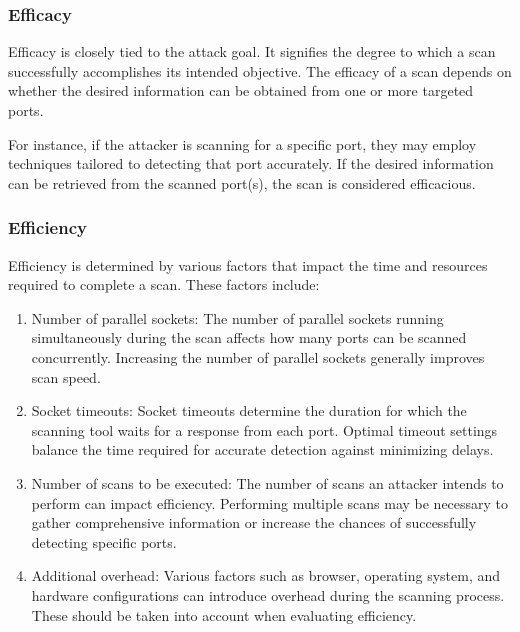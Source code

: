 \subsubsection{Efficacy}

Efficacy is closely tied to the attack goal. It signifies the degree to which a scan successfully accomplishes its intended objective. The efficacy of a scan depends on whether the desired information can be obtained from one or more targeted ports.

For instance, if the attacker is scanning for a specific port, they may employ techniques tailored to detecting that port accurately. If the desired information can be retrieved from the scanned port(s), the scan is considered efficacious.

\subsubsection{Efficiency}

Efficiency is determined by various factors that impact the time and resources required to complete a scan. These factors include:

\begin{enumerate}[label=\alph*.]
    \item Number of parallel sockets: The number of parallel sockets running simultaneously during the scan affects how many ports can be scanned concurrently. Increasing the number of parallel sockets generally improves scan speed.
    
    \item Socket timeouts: Socket timeouts determine the duration for which the scanning tool waits for a response from each port. Optimal timeout settings balance the time required for accurate detection against minimizing delays.
    
    \item Number of scans to be executed: The number of scans an attacker intends to perform can impact efficiency. Performing multiple scans may be necessary to gather comprehensive information or increase the chances of successfully detecting specific ports.
    
    \item Additional overhead: Various factors such as browser, operating system, and hardware configurations can introduce overhead during the scanning process. These should be taken into account when evaluating efficiency.
\end{enumerate}

